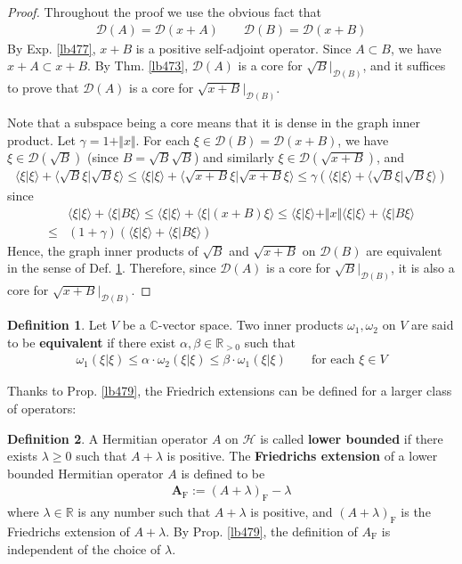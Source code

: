\documentclass[12pt,b5paper,notitlepage]{article}
\theoremstyle{definition}
\newtheorem{df}{Definition}[subsection]
\theoremstyle{plain}
\newcommand{\Dom}{\mathscr{D}}
\newcommand{\bk}[1]{\langle {#1}\rangle}
\newcommand{\Cbb}{\mathbb C}
\newcommand{\Rbb}{\mathbb R}
\newcommand{\MH}{\mathcal H}
\newcommand{\Frm}{{\mathrm F}}
\numberwithin{equation}{section}
\begin{document}
\begin{proof}
Throughout the proof we use the obvious fact that
\begin{align*}
\Dom(A)=\Dom(x+A)\qquad\Dom(B)=\Dom(x+B)
\end{align*}
By Exp. \ref{lb477}, $x+B$ is a positive self-adjoint operator. Since $A\subset B$, we have $x+A\subset x+B$. By Thm. \ref{lb473}, $\Dom(A)$ is a core for $\sqrt B|_{\Dom(B)}$, and it suffices to prove that $\Dom(A)$ is a core for $\sqrt{x+B}|_{\Dom(B)}$.

Note that a subspace being a core means that it is dense in the graph inner product. Let $\gamma=1+\Vert x\Vert$. For each $\xi\in\Dom(B)=\Dom(x+B)$, we have $\xi\in\Dom(\sqrt B)$ (since $B=\sqrt B\sqrt B$) and similarly $\xi\in\Dom(\sqrt{x+B})$, and
\begin{align*}
\bk{\xi|\xi}+\bk{\sqrt B\xi|\sqrt B\xi}\leq \bk{\xi|\xi}+\bk{\sqrt{x+B}\xi|\sqrt{x+B}\xi}\leq \gamma(\bk{\xi|\xi}+\bk{\sqrt B\xi|\sqrt B\xi})
\end{align*}
since
\begin{align*}
&\bk{\xi|\xi}+\bk{\xi|B\xi}\leq\bk{\xi|\xi}+\bk{\xi|(x+B)\xi}\leq \bk{\xi|\xi}+\Vert x\Vert\bk{\xi|\xi}+\bk{\xi|B\xi}\\
\leq&(1+\gamma)(\bk{\xi|\xi}+\bk{\xi|B\xi})
\end{align*}
Hence, the graph inner products of $\sqrt B$ and $\sqrt{x+B}$ on $\Dom(B)$ are equivalent in the sense of Def. \ref{lb481}. Therefore, since $\Dom(A)$ is a core for $\sqrt B|_{\Dom(B)}$, it is also a core for $\sqrt{x+B}|_{\Dom(B)}$. 
\end{proof}

\begin{df}\label{lb481}
Let $V$ be a $\Cbb$-vector space. Two inner products $\omega_1,\omega_2$ on $V$ are said to be \textbf{equivalent}  if there exist $\alpha,\beta\in\Rbb_{>0}$ such that
\begin{align*}
\omega_1(\xi|\xi)\leq\alpha\cdot\omega_2(\xi|\xi)\leq\beta\cdot\omega_1(\xi|\xi)\qquad\text{for each }\xi\in V
\end{align*}
\end{df}



Thanks to Prop. \ref{lb479}, the Friedrich extensions can be defined for a larger class of operators:

\begin{df}
A Hermitian operator $A$ on $\MH$ is called \textbf{lower bounded}  if there exists $\lambda\geq0$ such that $A+\lambda$ is positive. The \textbf{Friedrichs extension}  of a lower bounded Hermitian operator $A$ is defined to be
\begin{align*}
\pmb{A_\Frm}:=(A+\lambda)_\Frm-\lambda
\end{align*}
where $\lambda\in\Rbb$ is any number such that $A+\lambda$ is positive, and $(A+\lambda)_\Frm$ is the Friedrichs extension of $A+\lambda$. By Prop. \ref{lb479}, the definition of $A_\Frm$ is independent of the choice of $\lambda$.
\end{df}
\end{document}
